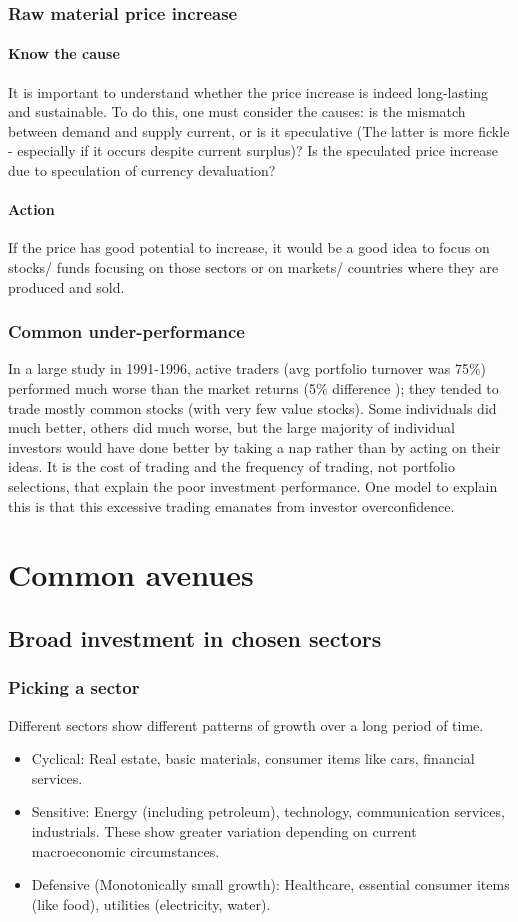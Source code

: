 \documentclass[oneside, article]{memoir}
\begin{document}
\subsubsection{Raw material price increase}
\paragraph{Know the cause}
It is important to understand whether the price increase is indeed long-lasting and sustainable. To do this, one must consider the causes: is the mismatch between demand and supply current, or is it speculative (The latter is more fickle - especially if it occurs despite current surplus)? Is the speculated price increase due to speculation of currency devaluation? 

\paragraph{Action}
If the price has good potential to increase, it would be a good idea to focus on stocks/ funds focusing on those sectors or on markets/ countries where they are produced and sold.

\subsubsection{Common under-performance}
In a large study in 1991-1996, active traders (avg portfolio turnover was 75\%) performed much worse than the market returns (5\% difference ); they tended to trade mostly common stocks (with very few value stocks). Some individuals did much better, others did much worse, but the large majority of individual investors would have done better by taking a nap rather than by acting on their ideas. It is the cost of trading and the frequency of trading, not portfolio selections, that explain the poor investment performance. One model to explain this is that this excessive trading emanates from investor overconfidence.


\section{Common avenues}
\subsection{Broad investment in chosen sectors}
\subsubsection{Picking a sector}
Different sectors show different patterns of growth over a long period of time.
\begin{itemize}
 \item Cyclical: Real estate, basic materials, consumer items like cars, financial services.
 \item Sensitive: Energy (including petroleum), technology, communication services, industrials. These show greater variation depending on current macroeconomic circumstances.
 \item Defensive (Monotonically small growth): Healthcare, essential consumer items (like food), utilities (electricity, water).
\end{itemize}
\end{document}
